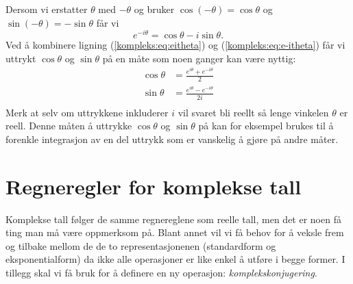 \documentclass[a4paper,norsk,12pt]{article}
\def\dx{\ensuremath{\mathrm{d}x}}
\newcounter{exa}
\begin{document}
Dersom vi erstatter $\theta$ med $-\theta$ og bruker $\cos(-\theta) = \cos\theta$ og $\sin(-\theta) = -\sin\theta$ får vi
\begin{equation}
	\label{kompleks:eq:e-itheta}
	e^{-i\theta} = \cos\theta - i\sin\theta.
\end{equation}
Ved å kombinere ligning (\ref{kompleks:eq:eitheta}) og (\ref{kompleks:eq:e-itheta}) får vi uttrykt $\cos\theta$ og $\sin\theta$ på en måte som noen ganger kan være nyttig:
\begin{align*}
	\cos\theta &= \frac{e^{i\theta}+e^{-i\theta}}{2} \\
	\sin\theta &= \frac{e^{i\theta}-e^{-i\theta}}{2i} \\
\end{align*}
Merk at selv om uttrykkene inkluderer $i$ vil svaret bli reellt så lenge vinkelen $\theta$ er reell. Denne måten å uttrykke $\cos\theta$ og $\sin\theta$ på kan for eksempel brukes til å forenkle integrasjon av en del uttrykk som er vanskelig å gjøre på andre måter.

\section{Regneregler for komplekse tall}
Komplekse tall følger de samme regnereglene som reelle tall, men det er noen få ting man må være oppmerksom på. Blant annet vil vi få behov for å veksle frem og tilbake mellom de de to representasjonenen (standardform og eksponentialform) da ikke alle operasjoner er like enkel å utføre i begge former. I tillegg skal vi få bruk for å definere en ny operasjon: \emph{komplekskonjugering}.
\end{document}
